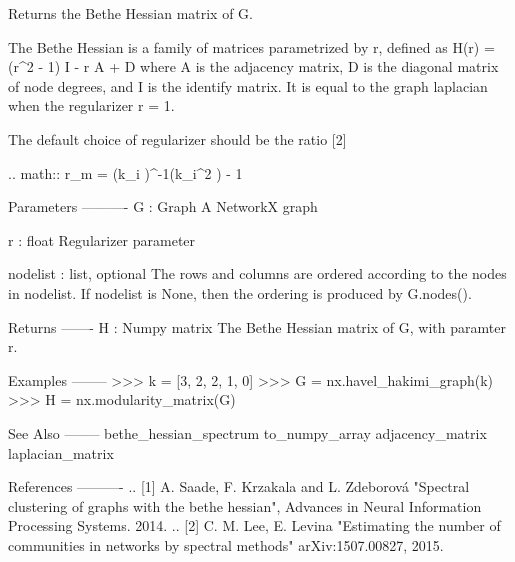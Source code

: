 \begin{DoxyVerb}Returns the Bethe Hessian matrix of G.

The Bethe Hessian is a family of matrices parametrized by r, defined as
H(r) = (r^2 - 1) I - r A + D where A is the adjacency matrix, D is the
diagonal matrix of node degrees, and I is the identify matrix. It is equal
to the graph laplacian when the regularizer r = 1.

The default choice of regularizer should be the ratio [2]

.. math::
  r_m = \left(\sum k_i \right)^{-1}\left(\sum k_i^2 \right) - 1

Parameters
----------
G : Graph
   A NetworkX graph

r : float
   Regularizer parameter

nodelist : list, optional
   The rows and columns are ordered according to the nodes in nodelist.
   If nodelist is None, then the ordering is produced by G.nodes().


Returns
-------
H : Numpy matrix
  The Bethe Hessian matrix of G, with paramter r.

Examples
--------
>>> k = [3, 2, 2, 1, 0]
>>> G = nx.havel_hakimi_graph(k)
>>> H = nx.modularity_matrix(G)


See Also
--------
bethe_hessian_spectrum
to_numpy_array
adjacency_matrix
laplacian_matrix

References
----------
.. [1] A. Saade, F. Krzakala and L. Zdeborová
   "Spectral clustering of graphs with the bethe hessian",
   Advances in Neural Information Processing Systems. 2014.
.. [2] C. M. Lee, E. Levina
   "Estimating the number of communities in networks by spectral methods"
   arXiv:1507.00827, 2015.
\end{DoxyVerb}
 